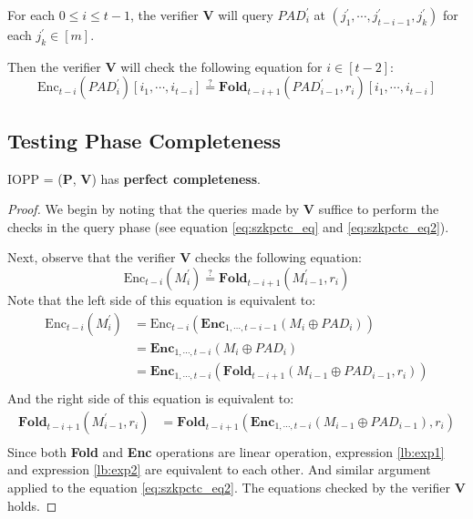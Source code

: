 \begin{enumerate}
    For each $0 \le i \le t-1$, 
    the verifier $\textbf{V}$ will query $PAD_{i}^{\prime}$ at $(j_1^\prime, \cdots, j_{t-i-1}^\prime, j_k^\prime)$ for each $j_k^\prime \in [m]$. 
    
    Then the verifier $\textbf{V}$ will check the following equation for $i \in [t-2]$:
\begin{equation}
\label{eq:szkpctc_eq2}
    \text{Enc}_{t-i}(PAD_i^\prime)[i_1, \cdots, i_{t-i}] \stackrel{?}{=} \textbf{Fold}_{t-i+1}(PAD_{i-1}^\prime, r_i) [i_1, \cdots, i_{t-i}]
\end{equation}




\end{enumerate}

\subsection{Testing Phase Completeness}

\begin{lemma}
\label{lemma:szkpctcc}

IOPP = ($\textbf{P}$, $\textbf{V}$) has \textbf{perfect completeness}.

\end{lemma}
\begin{proof}
We begin by noting that the queries made by $\textbf{V}$ suffice to perform the checks in the query phase (see equation \ref{eq:szkpctc_eq} and \ref{eq:szkpctc_eq2}).

Next, observe that the verifier $\textbf{V}$ checks the following equation:
$$
    \text{Enc}_{t-i}(M_i^\prime) \stackrel{?}{=} 
    \textbf{Fold}_{t-i+1}(M_{i-1}^\prime, r_i) 
$$
Note that the left side of this equation is equivalent to:
\begin{align}
\text{Enc}_{t-i}(M_i^\prime) \nonumber
&= \text{Enc}_{t-i}(\textbf{Enc}_{1, \cdots, t- i - 1}(M_i \oplus PAD_i)) \nonumber \\
&= \textbf{Enc}_{1, \cdots, t-i}(M_i \oplus PAD_i) \nonumber \\
&= \textbf{Enc}_{1, \cdots, t-i}(\textbf{Fold}_{t-i+1}(M_{i-1} \oplus PAD_{i-1}, r_i)) \label{lb:exp1} \\
\end{align}
And the right side of this equation is equivalent to:
\begin{align}
\textbf{Fold}_{t-i+1}(M_{i-1}^\prime, r_i) 
&= \textbf{Fold}_{t-i+1}(\textbf{Enc}_{1, \cdots, t- i}(M_{i-1} \oplus PAD_{i-1}), r_i) \label{lb:exp2} \\
\end{align}
Since both \textbf{Fold} and \textbf{Enc} operations are linear operation, expression \ref{lb:exp1} and  expression \ref{lb:exp2} are equivalent to each other. And similar argument applied to the equation \ref{eq:szkpctc_eq2}.
The equations checked by the verifier $\textbf{V}$ holds.

\end{proof}




